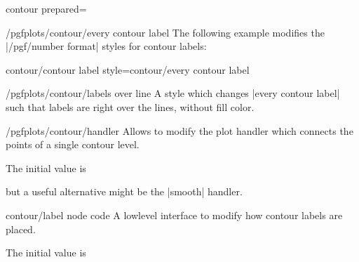 {{\begin{plottype}[/pgfplots]{contour prepared=\textcolor{black}{}}
\begin{stylekey}{/pgfplots/contour/every contour label}
		The following example modifies the |/pgf/number format| styles for contour labels:
\begin{codeexample}[]
\end{codeexample}
	\end{stylekey}
	
\pgfplotsshortstylekey contour/contour label style=contour/every contour label\pgfeov
	\begin{stylekey}{/pgfplots/contour/labels over line}
		A style which changes |every contour label| such that labels are right over the lines, without fill color.

\begin{codeexample}[]
\end{codeexample}
	\end{stylekey}

	\begin{stylekey}{/pgfplots/contour/handler}
		Allows to modify the plot handler which connects the points of a single contour level.

		The initial value is 
\begin{codeexample}
\end{codeexample}
		but a useful alternative might be the |smooth| handler.
	\end{stylekey}

	\begin{pgfplotscodekey}{contour/label node code}
		A lowlevel interface to modify how contour labels are placed.

		The initial value is
\begin{codeexample}
\end{codeexample}
	\end{pgfplotscodekey}


\end{plottype}}}
